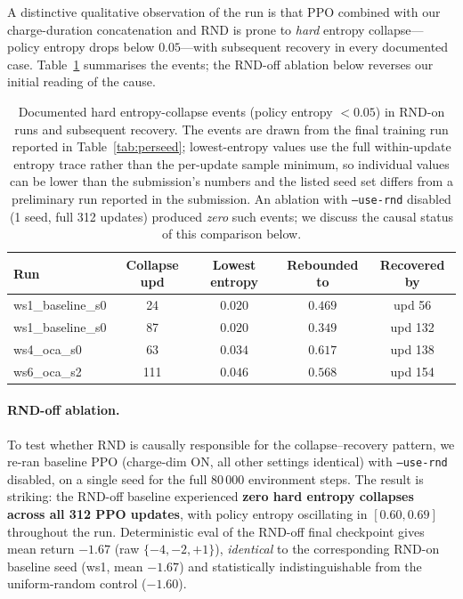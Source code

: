 \documentclass{article}
\begin{document}
A distinctive qualitative observation of the run is that PPO
combined with our charge-duration concatenation and RND is prone
to \emph{hard} entropy collapse---policy entropy drops below
$0.05$---with subsequent recovery in every documented case.
Table~\ref{tab:collapse} summarises the events; the RND-off
ablation below reverses our initial reading of the cause.

\begin{table}[h]
  \caption{Documented hard entropy-collapse events (policy entropy
  $<\!0.05$) in RND-on runs and subsequent recovery. The events
  are drawn from the final training run reported in
  Table~\ref{tab:perseed}; lowest-entropy values use the full
  within-update entropy trace rather than the per-update sample
  minimum, so individual values can be lower than the submission's
  numbers and the listed seed set differs from a preliminary run
  reported in the submission. An ablation with \texttt{--use-rnd}
  disabled (1 seed, full 312 updates) produced \emph{zero} such
  events; we discuss the causal status of this comparison below.}
  \label{tab:collapse}
  \centering
  \small
  \begin{tabular}{lcccc}
    \toprule
    \textbf{Run} & \textbf{Collapse upd} & \textbf{Lowest entropy}
    & \textbf{Rebounded to} & \textbf{Recovered by} \\
    \midrule
    ws1\_baseline\_s0 & 24  & $0.020$ & $0.469$ & upd 56 \\
    ws1\_baseline\_s0 & 87  & $0.020$ & $0.349$ & upd 132 \\
    ws4\_oca\_s0      & 63  & $0.034$ & $0.617$ & upd 138 \\
    ws6\_oca\_s2      & 111 & $0.046$ & $0.568$ & upd 154 \\
    \bottomrule
  \end{tabular}
\end{table}

\paragraph{RND-off ablation.} To test whether RND is causally
responsible for the collapse--recovery pattern, we re-ran baseline
PPO (charge-dim ON, all other settings identical) with
\texttt{--use-rnd} disabled, on a single seed for the full
$80\,000$ environment steps. The result is striking: the RND-off
baseline experienced \textbf{zero hard entropy collapses across
all 312 PPO updates}, with policy entropy oscillating in
$[0.60, 0.69]$ throughout the run. Deterministic eval of the
RND-off final checkpoint gives mean return $-1.67$ (raw
$\{-4,-2,+1\}$), \emph{identical} to the corresponding RND-on
baseline seed (ws1, mean $-1.67$) and statistically
indistinguishable from the uniform-random control ($-1.60$).
\end{document}
